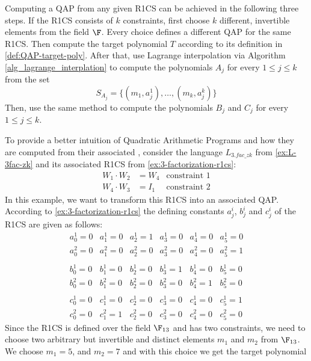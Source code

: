 Computing a QAP from any given R1CS can be achieved in the following three steps. If the R1CS consists of $k$ constraints, first choose $k$ different, invertible elements from the field $\F$. Every choice defines a different QAP for the same R1CS. Then compute the target polynomial $T$ according to its definition in \ref{def:QAP-target-poly}. After that, use Lagrange interpolation via Algorithm \ref{alg_lagrange_interplation} to compute the polynomials $A_j$ for every $1\leq j \leq k$ from the set 
\begin{equation}
S_{A_j} = \{(m_1,a^1_j),\ldots,(m_k,a^k_j)\}
\end{equation}
Then, use the same method to compute the polynomials $B_j$ and $C_j$ for every $1\leq j \leq k$. 
\begin{example}[3-factorization]
\label{ex:3-fac-QAP}  To provide a better intuition of Quadratic Arithmetic Programs and how they are computed from their associated , consider the language $L_{3.fac\_zk}$ from \examplename{} \ref{ex:L-3fac-zk} and its associated R1CS from \examplename{} \ref{ex:3-factorization-r1cs}:
\begin{align*}
W_1 \cdot W_2 & = W_4 & \text{constraint } 1\\
W_4 \cdot W_3 & = I_1 & \text{constraint } 2
\end{align*}
In this example, we want to transform this R1CS into an associated QAP. According to \examplename{} \ref{ex:3-factorization-r1cs} the defining constants $a_j^i$, $b_j^i$ and $c_j^i$ of the R1CS are given as follows:
$$
\begin{array}{llllll}
a_0^1 = 0 & a_1^1= 0 & a_2^1= 1 & a_3^1 = 0 & a_4^1= 0  & a_5^1= 0 \\ 
a_0^2 = 0 & a_1^2= 0 & a_2^2= 0 & a_3^2 = 0 & a_4^2= 0  & a_5^2= 1 \\ 
\\
b_0^1 = 0 & b_1^1= 0 & b_2^1= 0 & b_3^1 = 1 & b_4^1= 0  & b_5^1= 0 \\ 
b_0^2 = 0 & b_1^2= 0 & b_2^2= 0 & b_3^2 = 0 & b_4^2= 1  & b_5^2= 0 \\ 
\\
c_0^1 = 0 & c_1^1= 0 & c_2^1= 0 & c_3^1 = 0 & c_4^1= 0  & c_5^1= 1 \\ 
c_0^2 = 0 & c_1^2= 1 & c_2^2= 0 & c_3^2 = 0 & c_4^2= 0  & c_5^2= 0 
\end{array} 
$$
Since the R1CS is defined over the field $\F_{13}$ and has two constraints, we need to choose two arbitrary but invertible and distinct elements $m_1$ and $m_2$ from $\F_{13}$. We choose $m_{1}=5$, and $m_{2}=7$ and with this choice we get the target polynomial

\end{example}
